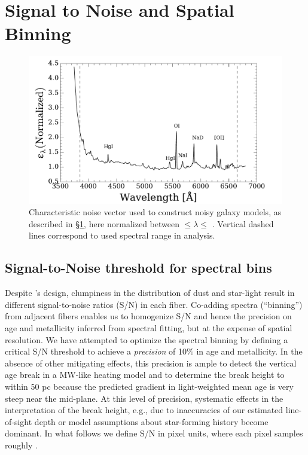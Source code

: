 \section{Signal to Noise and Spatial Binning}
\label{891_1:sec:maps}

\begin{figure}
  \centering
  \includegraphics[width=\columnwidth]{891_1/figs/noise_vec.pdf}
  \caption[Characteristic noise
  spectrum]{\label{891_1:fig:noise_vec}\fixspacing Characteristic
    noise vector used to construct noisy galaxy models, as described
    in \S\ref{891_1:sec:maps}, here normalized between 
    $\leq \lambda \leq$ . Vertical dashed lines
    correspond to used spectral range in analysis.}
\end{figure}

\subsection{Signal-to-Noise threshold for spectral bins}
\label{891_1:sec:snr_threshold}

Despite \GP's design, clumpiness in the distribution of dust and
star-light result in different signal-to-noise ratios (S/N) in each
fiber. Co-adding spectra (``binning'') from adjacent fibers enables us
to homogenize S/N and hence the precision on age and metallicity
inferred from spectral fitting, but at the expense of spatial
resolution. We have attempted to optimize the spectral binning by
defining a critical S/N threshold to achieve a {\it precision} of 10\%
in age and metallicity. In the absence of other mitigating effects,
this precision is ample to detect the vertical age break in a MW-like
heating model and to determine the break height to within 50 pc
because the predicted gradient in light-weighted mean age is very
steep near the mid-plane. At this level of precision, systematic
effects in the interpretation of the break height, e.g., due to
inaccuracies of our estimated line-of-sight depth or model assumptions
about star-forming history become dominant. In what follows we define
S/N in pixel units, where each pixel samples roughly .

